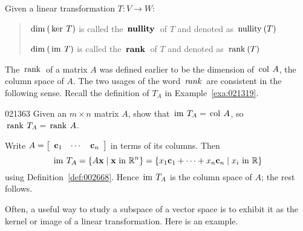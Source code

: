 \noindent Given a linear transformation $T : V \to W$:
\begin{quotation}

$\thinspace\operatorname{dim\medspace}(\thinspace\operatorname{ker \medspace}T)$ is called the $\thinspace\operatorname{\textbf{nullity}\medspace}$ of $T$ and denoted as $\thinspace\operatorname{nullity\medspace}(T)$


$\thinspace\operatorname{dim\medspace}(\thinspace\operatorname{im \medspace}T)$ is called the $\thinspace\operatorname{\textbf{rank}\medspace}$ of $T$ and denoted as $\thinspace\operatorname{rank\medspace}(T)$

\end{quotation}
The $\thinspace\operatorname{rank\medspace}$ of a matrix $A$ was defined earlier to be the dimension of $\thinspace\operatorname{col \medspace}A$, the column space of $A$. The two usages of the word $\thinspace\operatorname{\textit{rank}\medspace}$ are consistent in the following sense. Recall the definition of $T_{A}$ in Example~\ref{exa:021319}.


\begin{example}{}{021363}
Given an $m \times n$ matrix $A$, show that $\thinspace\operatorname{im \medspace}T_{A} = \thinspace\operatorname{col \medspace}A$, so $\thinspace\operatorname{rank \medspace}T_{A} = \thinspace\operatorname{rank \medspace}A$.


\begin{solution}
  Write $A = \left[ \begin{array}{ccc}
\textbf{c}_{1} & \cdots & \textbf{c}_{n}
\end{array} \right]$ in terms of its columns. Then
\begin{equation*}
\thinspace\operatorname{im \medspace}T_{A} = \{A\textbf{x} \mid \textbf{x} \mbox{ in } \mathbb{R}^n\} = \{x_1\textbf{c}_1 + \cdots + x_n\textbf{c}_n \mid x_i \mbox{ in } \mathbb{R} \}
\end{equation*}
using Definition~\ref{def:002668}. Hence $\thinspace\operatorname{im \medspace}T_{A}$ is the column space of $A$; the rest follows.
\end{solution}
\end{example}

Often, a useful way to study a subspace of a vector space is to exhibit it as the kernel or image of a linear transformation. Here is an example.


